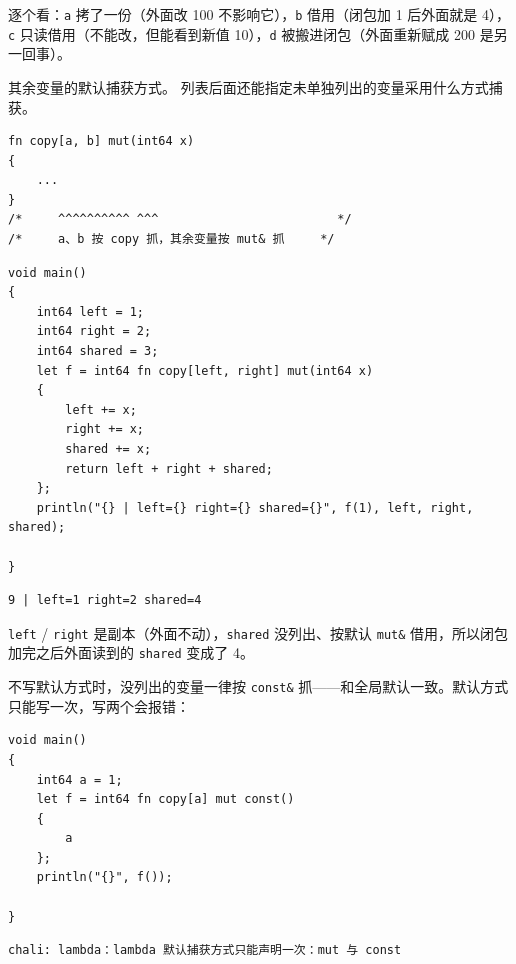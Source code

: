 逐个看：\texttt{a} 拷了一份（外面改 100 不影响它），\texttt{b} 借用（闭包加 1 后外面就是 4），\texttt{c} 只读借用（不能改，但能看到新值 10），\texttt{d} 被搬进闭包（外面重新赋成 200 是另一回事）。

其余变量的默认捕获方式。 列表后面还能指定未单独列出的变量采用什么方式捕获。

\par
\medskip
\begin{lstlisting}[style=chali]
fn copy[a, b] mut(int64 x)
{
    ...
}
/*     ^^^^^^^^^^ ^^^                         */
/*     a、b 按 copy 抓，其余变量按 mut& 抓     */
\end{lstlisting}
\par
\medskip

\par
\medskip
\begin{lstlisting}[style=chali]
void main()
{
    int64 left = 1;
    int64 right = 2;
    int64 shared = 3;
    let f = int64 fn copy[left, right] mut(int64 x)
    {
        left += x;
        right += x;
        shared += x;
        return left + right + shared;
    };
    println("{} | left={} right={} shared={}", f(1), left, right, shared);

}
\end{lstlisting}
\par
\medskip

\par
\medskip
\begin{lstlisting}[style=out]
9 | left=1 right=2 shared=4
\end{lstlisting}
\par
\medskip

\texttt{left} / \texttt{right} 是副本（外面不动），\texttt{shared} 没列出、按默认 \texttt{mut\&} 借用，所以闭包加完之后外面读到的 \texttt{shared} 变成了 4。

不写默认方式时，没列出的变量一律按 \texttt{const\&} 抓——和全局默认一致。默认方式只能写一次，写两个会报错：

\par
\medskip
\begin{lstlisting}[style=chali]
void main()
{
    int64 a = 1;
    let f = int64 fn copy[a] mut const()
    {
        a
    };
    println("{}", f());

}
\end{lstlisting}
\par
\medskip

\par
\medskip
\begin{lstlisting}[style=out]
chali: lambda：lambda 默认捕获方式只能声明一次：mut 与 const
\end{lstlisting}
\par
\medskip

